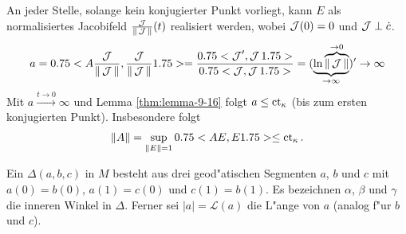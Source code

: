 An jeder Stelle, solange kein konjugierter Punkt vorliegt, kann $E$ als normalisiertes Jacobifeld $\frac{\operatorname{\mathcal{J}}}{\|\operatorname{\mathcal{J}}\|}(t)$ realisiert werden, wobei $\operatorname{\mathcal{J}}(0) = 0$ und $\operatorname{\mathcal{J}} \perp \dot c$.
\begin{align*}
  a = 0.75<A \frac{\operatorname{\mathcal{J}}}{\|\operatorname{\mathcal{J}}\|},\frac{\operatorname{\mathcal{J}}}{\|\operatorname{\mathcal{J}}\|}1.75>
  = \frac{0.75<\operatorname{\mathcal{J}}',\operatorname{\mathcal{J}}1.75>}{0.75<\operatorname{\mathcal{J}},\operatorname{\mathcal{J}}1.75>} = (\underbrace{\ln \overbrace{\|\operatorname{\mathcal{J}}\|}^{\to 0}}_{\to \infty})' \to \infty
\end{align*}
Mit $a \xrightarrow{t\to 0} \infty$ und Lemma \ref{thm:lemma-9-16} folgt $a \leq \operatorname{ct}_{\kappa}$ (bis zum ersten konjugierten Punkt).
Insbesondere folgt
\begin{align*}
  \|A\| = \sup_{\|E\| = 1} 0.75<AE,E1.75> \leq \operatorname{ct}_{\kappa}.
\end{align*}


\begin{dfn}
Ein  $\Delta(a,b,c)$ in $M$ besteht aus drei geod"atischen Segmenten $a$, $b$ und $c$ mit $a(0) = b(0)$, $a(1) = c(0)$ und $c(1) = b(1)$.
Es bezeichnen $\alpha$, $\beta$ und $\gamma$ die inneren Winkel in $\Delta$.
Ferner sei $|a| = \mathcal L(a)$ die L"ange von $a$ (analog f"ur $b$ und $c$). 
\begin{center}\end{center}
\end{dfn}

